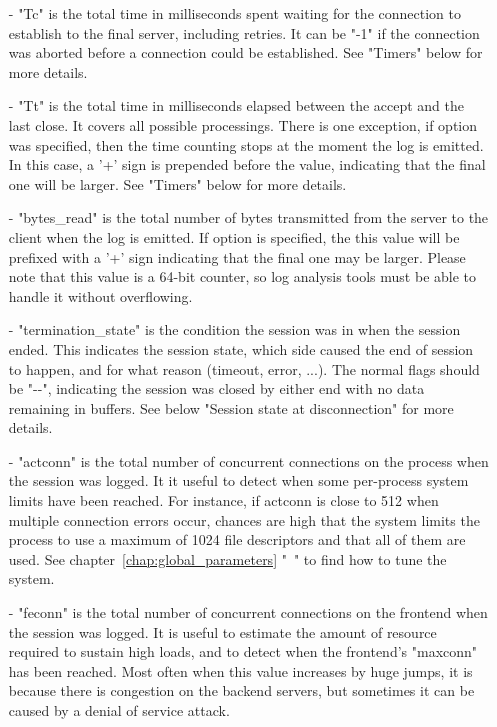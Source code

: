 \begin{itemize}
\item[-]
    "Tc" is the total time in milliseconds spent waiting for the connection to
    establish to the final server, including retries. It can be "-1" if the
    connection was aborted before a connection could be established. See
    "Timers" below for more details.

\item[-]
   "Tt" is the total time in milliseconds elapsed between the accept and the
    last close. It covers all possible processings. There is one exception, if
    option  was specified, then the time counting stops at the moment
    the log is emitted. In this case, a '+' sign is prepended before the value,
    indicating that the final one will be larger. See "Timers" below for more
    details.

\item[-]
    "bytes\_read" is the total number of bytes transmitted from the server to
    the client when the log is emitted. If option  is specified, the
    this value will be prefixed with a '+' sign indicating that the final one
    may be larger. Please note that this value is a 64-bit counter, so log
    analysis tools must be able to handle it without overflowing.

\item[-]
    "termination\_state" is the condition the session was in when the session
    ended. This indicates the session state, which side caused the end of
    session to happen, and for what reason (timeout, error, ...). The normal
    flags should be "{-}{-}", indicating the session was closed by either end with
    no data remaining in buffers. See below "Session state at disconnection"
    for more details.

\item[-]
    "actconn" is the total number of concurrent connections on the process when
    the session was logged. It it useful to detect when some per-process system
    limits have been reached. For instance, if actconn is close to 512 when
    multiple connection errors occur, chances are high that the system limits
    the process to use a maximum of 1024 file descriptors and that all of them
    are used. See chapter~\ref{chap:global_parameters}
    "~" to find how to tune the system.

\item[-]
    "feconn" is the total number of concurrent connections on the frontend when
    the session was logged. It is useful to estimate the amount of resource
    required to sustain high loads, and to detect when the frontend's "maxconn"
    has been reached. Most often when this value increases by huge jumps, it is
    because there is congestion on the backend servers, but sometimes it can be
    caused by a denial of service attack.


\end{itemize}
